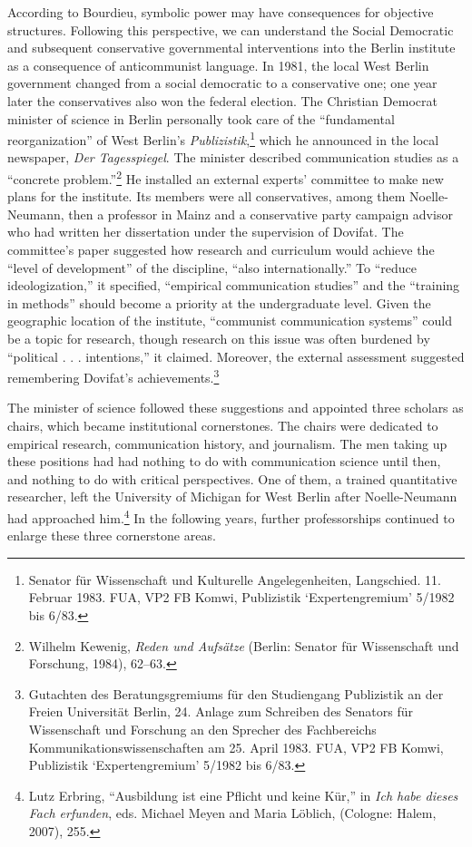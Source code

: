 \documentclass{tufte-handout}
\begin{document}
According to Bourdieu, symbolic power may have consequences for
objective structures. Following this perspective, we can understand the
Social Democratic and subsequent conservative governmental interventions
into the Berlin institute as a consequence of anticommunist language. In 1981, the local West Berlin government changed from a social democratic to a conservative one; one year later the conservatives also won the federal election. The Christian Democrat minister of science in Berlin
personally took care of the ``fundamental reorganization'' of West
Berlin's \emph{Publizistik},\footnote{Senator für Wissenschaft und
  Kulturelle Angelegenheiten, Langschied. 11. Februar 1983. FUA, VP2 FB
  Komwi, Publizistik `Expertengremium' 5/1982 bis 6/83.} which he
announced in the local newspaper, \emph{Der Tagesspiegel}. The minister
described communication studies as a ``concrete problem.''\footnote{Wilhelm
  Kewenig, \emph{Reden und Aufsätze} (Berlin: Senator für Wissenschaft
  und Forschung, 1984), 62--63.} He installed an external experts'
committee to make new plans for the institute. Its members were all
conservatives, among them Noelle-Neumann, then a professor in Mainz and
a conservative party campaign advisor who had written her dissertation
under the supervision of Dovifat. The committee's paper suggested how
research and curriculum would achieve the ``level of development'' of
the discipline, ``also internationally.'' To ``reduce ideologization,''
it specified, ``empirical communication studies'' and the ``training in
methods'' should become a priority at the undergraduate level. Given the
geographic location of the institute, ``communist communication
systems'' could be a topic for research, though research on this issue
was often burdened by ``political . . . intentions,'' it claimed.
Moreover, the external assessment suggested remembering Dovifat's
achievements.\footnote{Gutachten des Beratungsgremiums für den
  Studiengang Publizistik an der Freien Universität Berlin, 24. Anlage
  zum Schreiben des Senators für Wissenschaft und Forschung an den
  Sprecher des Fachbereichs Kommunikationswissenschaften am 25. April
  1983. FUA, VP2 FB Komwi, Publizistik `Expertengremium' 5/1982 bis
  6/83.}

The minister of science followed these suggestions and appointed three
scholars as chairs, which became institutional cornerstones. The chairs
were dedicated to empirical research, communication history, and
journalism. The men taking up these positions had had nothing to do with
communication science until then, and nothing to do with critical
perspectives. One of them, a trained quantitative researcher, left the
University of Michigan for West Berlin after Noelle-Neumann had
approached him.\footnote{Lutz Erbring, ``Ausbildung ist eine Pflicht und
  keine Kür,'' in \emph{Ich habe dieses Fach erfunden}, eds. Michael
  Meyen and Maria Löblich, (Cologne: Halem, 2007), 255.} In the
following years, further professorships continued to enlarge these three
cornerstone areas.
\end{document}
